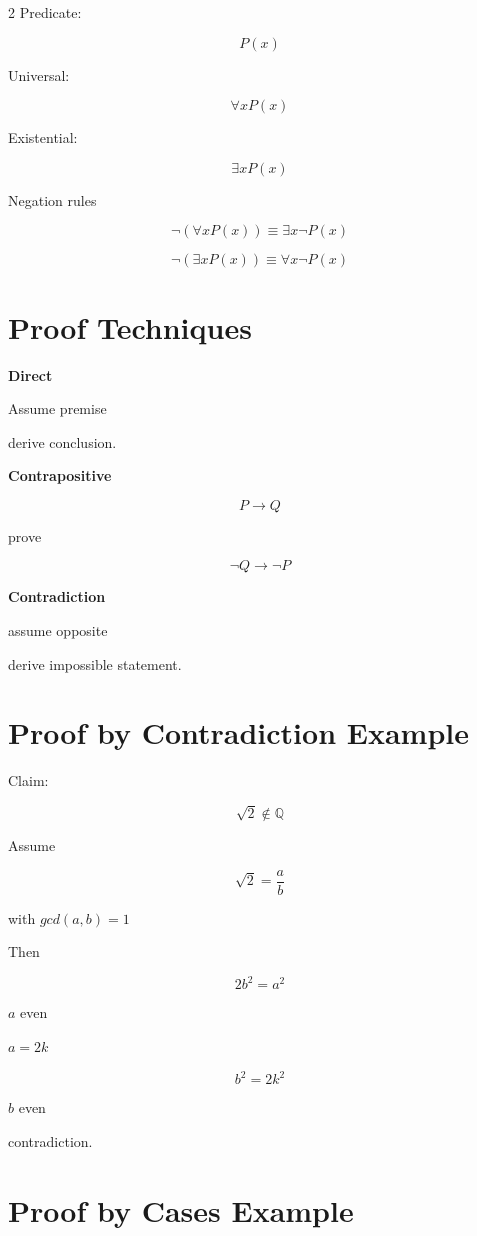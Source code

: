 \documentclass[9pt]{article}
\begin{document}
\begin{multicols}{2}
Predicate:

\[
P(x)
\]

Universal:

\[
\forall x P(x)
\]

Existential:

\[
\exists x P(x)
\]

Negation rules

\[
\neg(\forall xP(x))\equiv \exists x\neg P(x)
\]

\[
\neg(\exists xP(x))\equiv \forall x\neg P(x)
\]

\section*{Proof Techniques}

\textbf{Direct}

Assume premise

derive conclusion.

\textbf{Contrapositive}

\[
P\rightarrow Q
\]

prove

\[
\neg Q\rightarrow \neg P
\]

\textbf{Contradiction}

assume opposite

derive impossible statement.

\section*{Proof by Contradiction Example}

Claim:

\[
\sqrt2\notin \mathbb Q
\]

Assume

\[
\sqrt2=\frac ab
\]

with $gcd(a,b)=1$

Then

\[
2b^2=a^2
\]

$a$ even

$a=2k$

\[
b^2=2k^2
\]

$b$ even

contradiction.

\section*{Proof by Cases Example}


\end{multicols}
\end{document}
